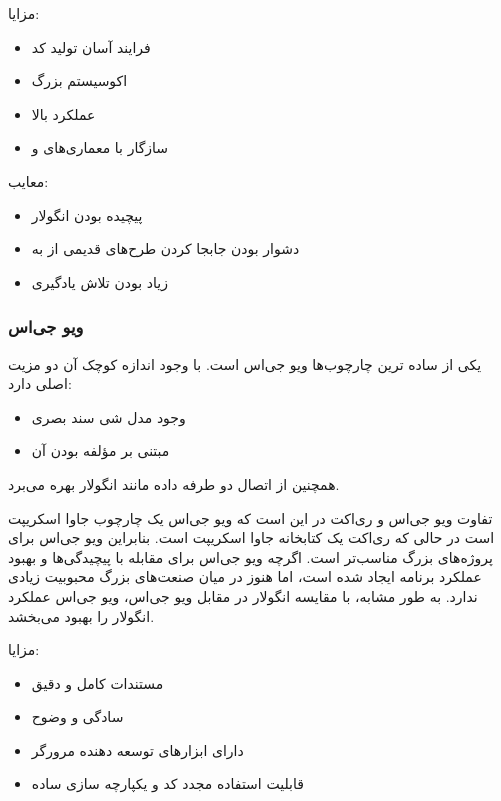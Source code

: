 مزایا:
\begin{itemize}
    \item فرایند آسان تولید کد
    \item اکوسیستم بزرگ
    \item عملکرد بالا
    \item سازگار با معماری‌های  و 
\end{itemize}


معایب:

\begin{itemize}
    \item پیچیده بودن انگولار
    \item دشوار بودن جابجا کردن طرح‌های قدیمی از  به 
    \item زیاد بودن تلاش یادگیری
\end{itemize}


\newpage

\subsubsection{ویو جی‌اس}

یکی از ساده ترین چارچوب‌ها ویو جی‌اس است. با وجود اندازه کوچک آن دو مزیت اصلی دارد:

\begin{itemize}
    \item وجود مدل شی سند بصری
    \item مبتنی بر مؤلفه بودن آن 
\end{itemize}
همچنین از اتصال دو طرفه داده مانند انگولار بهره می‌برد.


تفاوت ویو جی‌اس و ری‌اکت در این است که ویو جی‌اس یک چارچوب جاوا اسکریپت است در حالی که ری‌اکت یک کتابخانه جاوا اسکریپت است. بنابراین ویو جی‌اس برای پروژه‌های بزرگ مناسب‌تر است. اگرچه ویو جی‌اس برای مقابله با پیچیدگی‌ها و بهبود عملکرد برنامه ایجاد شده است، اما هنوز در میان صنعت‌های بزرگ محبوبیت زیادی ندارد. به طور مشابه، با مقایسه انگولار در مقابل ویو جی‌اس، ویو جی‌اس عملکرد انگولار را بهبود می‌بخشد.


مزایا:
\begin{itemize}
    \item مستندات کامل و دقیق
    \item سادگی و وضوح
    \item دارای ابزارهای توسعه دهنده مرورگر
    \item قابلیت استفاده مجدد کد و یکپارچه سازی ساده
\end{itemize}

